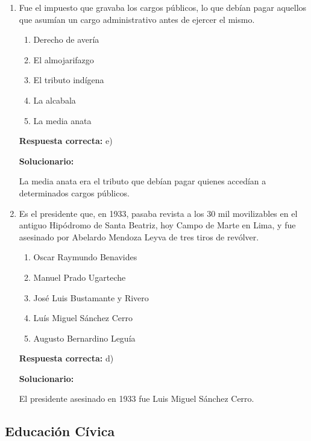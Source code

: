 \begin{enumerate}[resume]
	
	\item Fue el impuesto que gravaba los cargos públicos, lo que debían pagar aquellos que asumían un cargo administrativo antes de ejercer el mismo.
	\begin{enumerate}[label=\alph*)]
		\item Derecho de avería
		\item El almojarifazgo
		\item El tributo indígena
		\item La alcabala
		\item La media anata
	\end{enumerate}
	\textbf{Respuesta correcta:} e)
	
	\vspace{2mm}
	\textbf{Solucionario:}
	
	La media anata era el tributo que debían pagar quienes accedían a determinados cargos públicos.
	
	\vspace{6mm}
	
	\item Es el presidente que, en 1933, pasaba revista a los 30 mil movilizables en el antiguo Hipódromo de Santa Beatriz, hoy Campo de Marte en Lima, y fue asesinado por Abelardo Mendoza Leyva de tres tiros de revólver.
	\begin{enumerate}[label=\alph*)]
		\item Oscar Raymundo Benavides
		\item Manuel Prado Ugarteche
		\item José Luis Bustamante y Rivero
		\item Luís Miguel Sánchez Cerro
		\item Augusto Bernardino Leguía
	\end{enumerate}
	\textbf{Respuesta correcta:} d)
	
	\vspace{2mm}
	\textbf{Solucionario:}
	
	El presidente asesinado en 1933 fue Luis Miguel Sánchez Cerro.
	
	\vspace{6mm}
	
\end{enumerate}

\subsection*{Educación Cívica}

